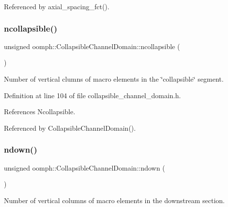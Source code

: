 Referenced by axial\+\_\+spacing\+\_\+fct().

\mbox{\label{classoomph_1_1CollapsibleChannelDomain_a59dd9d4001621752439ad95ceb8daa1b}} 
\subsubsection{\texorpdfstring{ncollapsible()}{ncollapsible()}}
{\footnotesize\ttfamily unsigned oomph\+::\+Collapsible\+Channel\+Domain\+::ncollapsible (\begin{DoxyParamCaption}{ }\end{DoxyParamCaption})\hspace{0.3cm}{\ttfamily [inline]}}



Number of vertical clumns of macro elements in the \char`\"{}collapsible\char`\"{} segment. 



Definition at line 104 of file collapsible\+\_\+channel\+\_\+domain.\+h.



References Ncollapsible.



Referenced by Collapsible\+Channel\+Domain().

\mbox{\label{classoomph_1_1CollapsibleChannelDomain_a0e1c69ac122606e4f883e96b51989d9f}} 
\subsubsection{\texorpdfstring{ndown()}{ndown()}}
{\footnotesize\ttfamily unsigned oomph\+::\+Collapsible\+Channel\+Domain\+::ndown (\begin{DoxyParamCaption}{ }\end{DoxyParamCaption})\hspace{0.3cm}{\ttfamily [inline]}}



Number of vertical columns of macro elements in the downstream section. 



